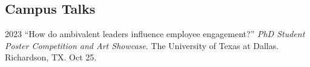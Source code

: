 \documentclass[11pt,letterpaper]{report} %
\begin{document}


    \subsection*{Campus Talks}

    \begin{tablist}


        \item[2023] \tab{}\enquote{How do ambivalent leaders influence employee engagement?} \textit{PhD Student Poster Competition and Art Showcase}. The University of Texas at Dallas. Richardson, TX. Oct 25.

    \end{tablist}







\end{document}
